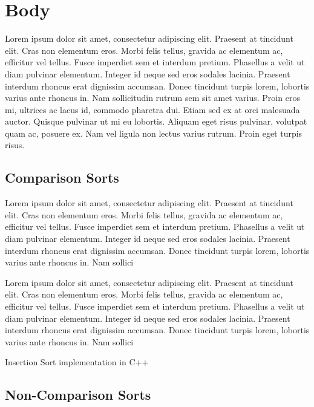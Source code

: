 \documentclass[12pt]{article}
\begin{document}
	
	\section{Body}
	
	Lorem ipsum dolor sit amet, consectetur adipiscing elit. Praesent at tincidunt elit. Cras non elementum eros. Morbi felis tellus, gravida ac elementum ac, efficitur vel tellus. Fusce imperdiet sem et interdum pretium. Phasellus a velit ut diam pulvinar elementum. Integer id neque sed eros sodales lacinia. Praesent interdum rhoncus erat dignissim accumsan. Donec tincidunt turpis lorem, lobortis varius ante rhoncus in. Nam sollicitudin rutrum sem sit amet varius. Proin eros mi, ultrices ac lacus id, commodo pharetra dui. Etiam sed ex at orci malesuada auctor. Quisque pulvinar ut mi eu lobortis. Aliquam eget risus pulvinar, volutpat quam ac, posuere ex. Nam vel ligula non lectus varius rutrum. Proin eget turpis risus.

	
	
	\subsection{Comparison Sorts}
	
	Lorem ipsum dolor sit amet, consectetur adipiscing elit. Praesent at tincidunt elit. Cras non elementum eros. Morbi felis tellus, gravida ac elementum ac, efficitur vel tellus. Fusce imperdiet sem et interdum pretium. Phasellus a velit ut diam pulvinar elementum. Integer id neque sed eros sodales lacinia. Praesent interdum rhoncus erat dignissim accumsan. Donec tincidunt turpis lorem, lobortis varius ante rhoncus in. Nam sollici
	
	
		
	Lorem ipsum dolor sit amet, consectetur adipiscing elit. Praesent at tincidunt elit. Cras non elementum eros. Morbi felis tellus, gravida ac elementum ac, efficitur vel tellus. Fusce imperdiet sem et interdum pretium. Phasellus a velit ut diam pulvinar elementum. Integer id neque sed eros sodales lacinia. Praesent interdum rhoncus erat dignissim accumsan. Donec tincidunt turpis lorem, lobortis varius ante rhoncus in. Nam sollici
	
	\begin{Snippet}[h]
		
		\caption[Insertion Sort]{Insertion Sort implementation in C++}	
	\end{Snippet}
	
	
	
	\subsection{Non-Comparison Sorts}
	
\end{document}
